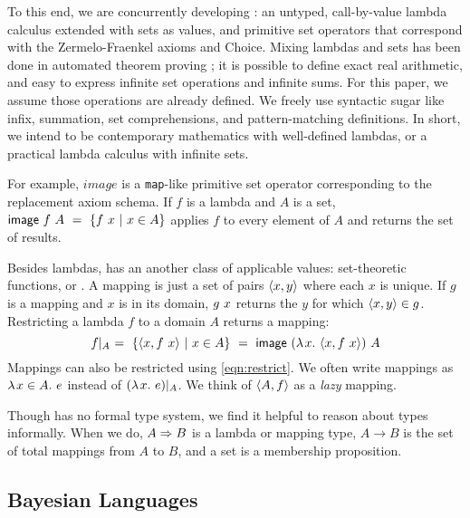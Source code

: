 To this end, we are concurrently developing \targetlang: an untyped, call-by-value lambda calculus extended with sets as values, and primitive set operators that correspond with the Zermelo-Fraenkel axioms and Choice. Mixing lambdas and sets has been done in automated theorem proving \cite{cit:paulson-1993-settheory-i,cit:paulson-1995-settheory-ii,cit:gordon-1996-holst}; it is possible to define exact real arithmetic, and easy to express infinite set operations and infinite sums.  For this paper, we assume those operations are already defined.  We freely use syntactic sugar like infix, summation, set comprehensions, and pattern-matching definitions. In short, we intend \targetlang to be contemporary mathematics with well-defined lambdas, or a practical lambda calculus with infinite sets.

For example, $image$ is a \texttt{map}-like primitive set operator corresponding to the replacement axiom schema. If $f$ is a lambda and $A$ is a set, ${\mathsf{image}}\ {f}\ {A}\ =\ \lbrace {{f}\ {x}} \ \lvert\ {x \in A} \rbrace$ applies $f$ to every element of $A$ and returns the set of results.

Besides lambdas, \targetlang has an another class of applicable values: set-theoretic functions, or . A mapping is just a set of pairs $\langle{x,y}\rangle$ where each $x$ is unique. If $g$ is a mapping and $x$ is in its domain, ${g}\ {x}$ returns the $y$ for which $\langle{x,y}\rangle \in g$. Restricting a lambda $f$ to a domain $A$ returns a mapping:
\begin{equation}
	{f}\lvert_{A}
		\ =\ \lbrace {\langle{x,{f}\ {x}}\rangle} \ \lvert\ {x \in A} \rbrace
		\ =\ {\mathsf{image}}\ {(\lambda\mspace{2mu}{x}\ldotp\, {\langle{x,{f}\ {x}}\rangle})}\ {A}
\label{eqn:restrict}
\end{equation}
Mappings can also be restricted using \eqref{eqn:restrict}. We often write mappings as $\lambda\mspace{2mu}{x \in A}\ldotp\, e$ instead of ${(\lambda\mspace{2mu}{x}\ldotp\, e)}\lvert_{A}$. We think of $\langle{A, f}\rangle$ as a \textit{lazy} mapping.

Though \targetlang has no formal type system, we find it helpful to reason about types informally. When we do, $A \Rightarrow B$ is a lambda or mapping type, $A \to B$ is the set of total mappings from $A$ to $B$, and a set is a membership proposition.

\subsection{Bayesian Languages}

